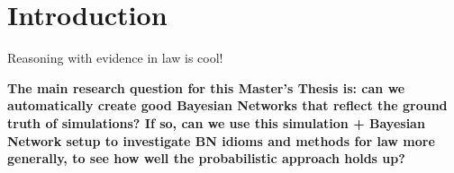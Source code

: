  

\chapter[Introduction]{Introduction}

Reasoning with evidence in law is cool!




\textbf{The main research question for this Master's Thesis is: can we automatically create good Bayesian Networks that reflect the ground truth of simulations? If so, can we use this simulation + Bayesian Network setup to investigate BN idioms and methods for law more generally, to see how well the probabilistic approach holds up?}


